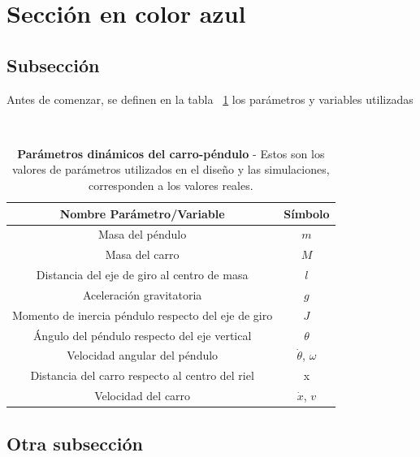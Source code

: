 \section{\textcolor{Azul}{Sección en color azul}}
\subsection{Subsección}
Antes de comenzar, se definen  en la tabla ~\ref{tab:tabla} los parámetros y variables utilizadas

\begin{table}[htdp]                             %
\centering\                                     %
\begin{tabular}{||c | c ||}                     %
\hline                                          %
\hline
Nombre Parámetro/Variable & Símbolo\\
\hline
\hline
Masa del péndulo & $m$ \\
\hline
Masa del carro & $M$\\
\hline
Distancia del eje de giro al centro de masa & $l$ \\
\hline
Aceleración gravitatoria & $g$ \\
\hline
Momento de inercia péndulo respecto del eje de giro& $J$ \\
\hline
Ángulo del péndulo respecto del eje vertical & $\theta$\\
\hline
Velocidad angular del péndulo & $\dot{\theta}$, $\omega$\\
\hline
Distancia del carro respecto al centro del riel & x\\
\hline
Velocidad del carro & $\dot{x}$, $v$\\
\hline
\hline
\end{tabular}
\caption[Parámetros dinámicos del carro-péndulo]{\textbf{Parámetros dinámicos del carro-péndulo} - Estos son los valores de parámetros utilizados en el diseño y las simulaciones, corresponden a los valores reales.}
\label{tab:tabla}                              %
\end{table}

\blindtext



\subsection{Otra subsección}

\Blindtext